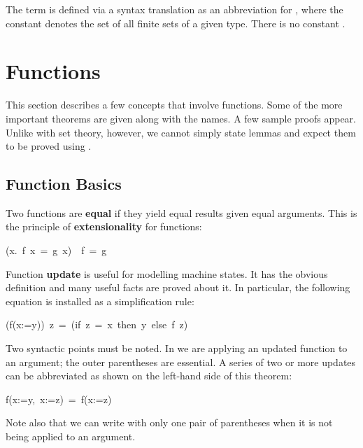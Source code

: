 \begin{warn}
The term  is defined via a syntax translation as an
abbreviation for , where the constant
 denotes the set of all finite sets of a given type.  There
is no constant .
\end{warn}


\section{Functions}

%
This section describes a few concepts that involve
functions.  Some of the more important theorems are given along with the 
names. A few sample proofs appear. Unlike with set theory, however, 
we cannot simply state lemmas and expect them to be proved using
. 

\subsection{Function Basics}

Two functions are \textbf{equal}
if they yield equal results given equal
arguments.  This is the principle of
\textbf{extensionality} for
functions:
\begin{isabelle}
({\isasymAnd}x.\ f\ x\ =\ g\ x)\ {\isasymLongrightarrow}\ f\ =\ g
\end{isabelle}

%
Function \textbf{update} is useful for modelling machine states. It has 
the obvious definition and many useful facts are proved about 
it.  In particular, the following equation is installed as a simplification
rule:
\begin{isabelle}
(f(x:=y))\ z\ =\ (if\ z\ =\ x\ then\ y\ else\ f\ z)
\end{isabelle}
Two syntactic points must be noted.  In
 we are applying an updated function to an
argument; the outer parentheses are essential.  A series of two or more
updates can be abbreviated as shown on the left-hand side of this theorem:
\begin{isabelle}
f(x:=y,\ x:=z)\ =\ f(x:=z)
\end{isabelle}
Note also that we can write  with only one pair of parentheses
when it is not being applied to an argument.

